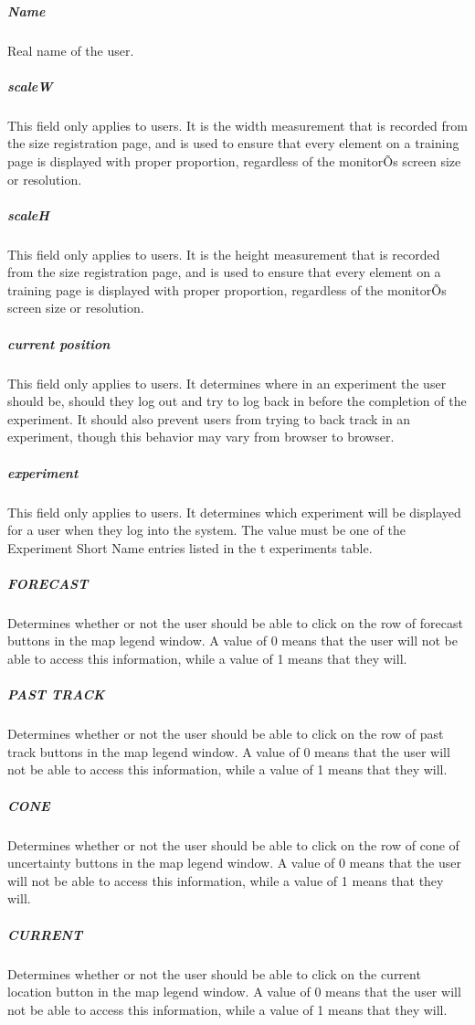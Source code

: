 \documentclass[article]{ij4uq}              %
\begin{document}
\subparagraph{Name}
Real name of the user. 

\subparagraph{scaleW}
This field only applies to users. It is the width measurement that is recorded from the size registration page, and is used to ensure that every element on a training page is displayed with proper proportion, regardless of the monitorÕs screen size or resolution. 

\subparagraph{scaleH}
This field only applies to users. It is the height measurement that is recorded from the size registration page, and is used to ensure that every element on a training page is displayed with proper proportion, regardless of the monitorÕs screen size or resolution. 

\subparagraph{current position}
This field only applies to users. It determines where in an experiment the user should be, should they log out and try to log back in before the completion of the experiment. It should also prevent users from trying to back track in an experiment, though this behavior may vary from browser to browser. 

\subparagraph{experiment}
This field only applies to users. It determines which experiment will be displayed for a user when they log into the system. The value must be one of the Experiment Short Name entries listed in the t experiments table. 

\subparagraph{FORECAST}
Determines whether or not the user should be able to click on the row of forecast buttons in the map legend window. A value of 0 means that the user will not be able to access this information, while a value of 1 means that they will. 

\subparagraph{PAST TRACK}
Determines whether or not the user should be able to click on the row of past track buttons in the map legend window. A value of 0 means that the user will not be able to access this information, while a value of 1 means that they will. 

\subparagraph{CONE}
Determines whether or not the user should be able to click on the row of cone of uncertainty buttons in the map legend window. A value of 0 means that the user will not be able to access this information, while a value of 1 means that they will. 

\subparagraph{CURRENT}
Determines whether or not the user should be able to click on the current location button in the map legend window. A value of 0 means that the user will not be able to access this information, while a value of 1 means that they will.
\end{document}
